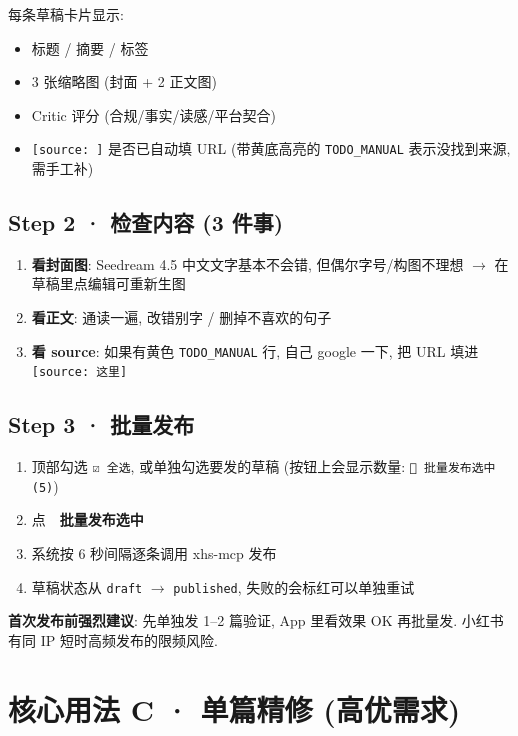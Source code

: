 \documentclass[11pt,a4paper]{article}
\begin{document}
每条草稿卡片显示:
\begin{itemize}[leftmargin=*]
  \item 标题 / 摘要 / 标签
  \item 3 张缩略图 (封面 + 2 正文图)
  \item Critic 评分 (合规/事实/读感/平台契合)
  \item \texttt{[source: ]} 是否已自动填 URL (带黄底高亮的 \texttt{TODO\_MANUAL} 表示没找到来源, 需手工补)
\end{itemize}

\subsection{Step 2 · 检查内容 (3 件事)}

\begin{enumerate}[leftmargin=*]
  \item \textbf{看封面图}: Seedream 4.5 中文文字基本不会错, 但偶尔字号/构图不理想 \(\to\) 在草稿里点编辑可重新生图
  \item \textbf{看正文}: 通读一遍, 改错别字 / 删掉不喜欢的句子
  \item \textbf{看 source}: 如果有黄色 \texttt{TODO\_MANUAL} 行, 自己 google 一下, 把 URL 填进 \texttt{[source: 这里]}
\end{enumerate}

\subsection{Step 3 · 批量发布}

\begin{enumerate}[leftmargin=*]
  \item 顶部勾选 \texttt{☑ 全选}, 或单独勾选要发的草稿 (按钮上会显示数量: \texttt{🚀 批量发布选中 (5)})
  \item 点 \textbf{🚀 批量发布选中}
  \item 系统按 6 秒间隔逐条调用 xhs-mcp 发布
  \item 草稿状态从 \texttt{draft} \(\to\) \texttt{published}, 失败的会标红可以单独重试
\end{enumerate}

\begin{warnbox}
\small
\textbf{首次发布前强烈建议}: 先单独发 1–2 篇验证, App 里看效果 OK 再批量发. 小红书有同 IP 短时高频发布的限频风险.
\end{warnbox}

\section{核心用法 C · 单篇精修 (高优需求)}
\end{document}
